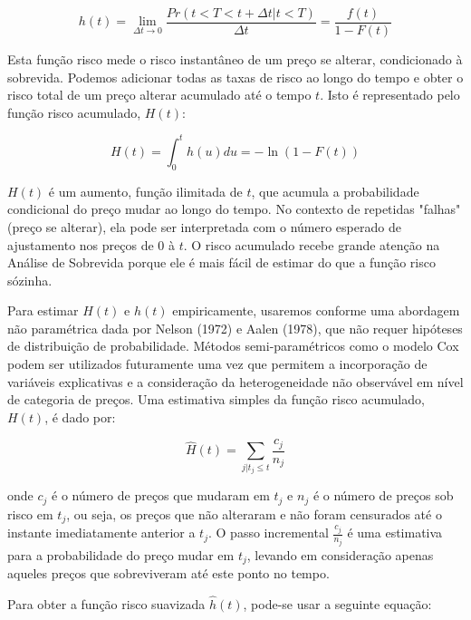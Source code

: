 \begin{algorithm}[H]
\begin{equation}\label{eq04en01}
h\left(t\right)=\lim_{\Delta t\rightarrow 0}{\frac{Pr\left(t<T<t+\Delta t|t<T\right)}{\Delta t}=\frac{f\left(t\right)}{1-F\left(t\right)}} 
\end{equation}

Esta função risco mede o risco instantâneo de um preço se alterar, condicionado à sobrevida. Podemos adicionar todas as taxas de risco ao longo do tempo e obter o risco total de um preço alterar acumulado até o tempo $t$. Isto é representado pelo função risco acumulado, $H(t)$:

\begin{equation}\label{eq05en01}
H\left(t\right)=\int_{0}^{t}{h\left(u\right)du=-\ln{\left(1-F\left(t\right)\right)}} 
\end{equation}

$H(t)$ é um aumento, função ilimitada de $t$, que acumula a probabilidade condicional do preço mudar ao longo do tempo. No contexto de repetidas "falhas" (preço se alterar), ela pode ser interpretada com o número esperado de ajustamento nos preços de $0$ à $t$. O risco acumulado recebe grande atenção na Análise de Sobrevida porque ele é mais fácil de estimar do que a função risco sózinha. 

Para estimar $H(t)$ e $h(t)$ empiricamente, usaremos conforme \citet{cavallo2010scraped} uma abordagem não paramétrica dada por Nelson (1972) e Aalen (1978), que não requer hipóteses de distribuição de probabilidade. Métodos semi-paramétricos como o modelo Cox podem ser utilizados futuramente uma vez que permitem a incorporação de variáveis explicativas e a consideração da heterogeneidade não observável em nível de categoria de preços. Uma estimativa simples da função risco acumulado, $H(t)$, é dado por:

\begin{equation}\label{eq06en01}
\hat{H}\left(t\right)=\sum_{j|{t}_{j}\le t}{\frac{{c}_{j}}{{n}_{j}}} 
\end{equation}

\noindent onde ${c}_{j}$ é o número de preços que mudaram em ${t}_{j}$ e ${n}_{j}$ é o número de preços sob risco em ${t}_{j}$, ou seja, os preços que não alteraram e não foram censurados até o instante imediatamente anterior a $t_{j}$. O passo incremental $\frac{{c}_{j}}{{n}_{j}}$ é uma estimativa para a probabilidade do preço mudar em ${t}_{j}$, levando em consideração apenas aqueles preços que sobreviveram até este ponto no tempo. 

Para obter a função risco suavizada $\hat{h}\left(t\right)$, pode-se usar a seguinte equação:


\end{algorithm}
